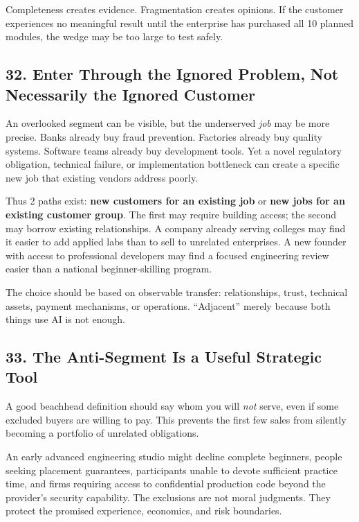Completeness creates evidence. Fragmentation creates opinions. If the customer experiences no meaningful result until the enterprise has purchased all 10 planned modules, the wedge may be too large to test safely.

\subsection*{32. Enter Through the Ignored Problem, Not Necessarily the Ignored Customer}

An overlooked segment can be visible, but the underserved \emph{job} may be more precise. Banks already buy fraud prevention. Factories already buy quality systems. Software teams already buy development tools. Yet a novel regulatory obligation, technical failure, or implementation bottleneck can create a specific new job that existing vendors address poorly.

Thus 2 paths exist: \textbf{new customers for an existing job} or \textbf{new jobs for an existing customer group}. The first may require building access; the second may borrow existing relationships. A company already serving colleges may find it easier to add applied labs than to sell to unrelated enterprises. A new founder with access to professional developers may find a focused engineering review easier than a national beginner-skilling program.

The choice should be based on observable transfer: relationships, trust, technical assets, payment mechanisms, or operations. ``Adjacent'' merely because both things use AI is not enough.

\subsection*{33. The Anti-Segment Is a Useful Strategic Tool}

A good beachhead definition should say whom you will \emph{not} serve, even if some excluded buyers are willing to pay. This prevents the first few sales from silently becoming a portfolio of unrelated obligations.

An early advanced engineering studio might decline complete beginners, people seeking placement guarantees, participants unable to devote sufficient practice time, and firms requiring access to confidential production code beyond the provider's security capability. The exclusions are not moral judgments. They protect the promised experience, economics, and risk boundaries.

